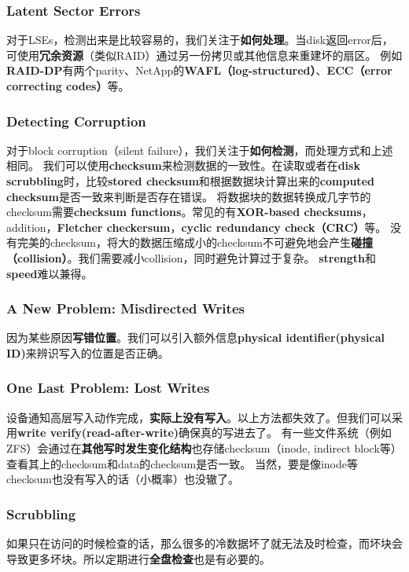 \documentclass{article}
\begin{document}
\subsubsection{Latent Sector Errors}
对于LSEs，检测出来是比较容易的，我们关注于\textbf{如何处理}。当disk返回error后，可使用\textbf{冗余资源}（类似RAID）通过另一份拷贝或其他信息来重建坏的扇区。
例如\textbf{RAID-DP}有两个parity、NetApp的\textbf{WAFL（log-structured）}、\textbf{ECC（error correcting codes）}等。
\subsubsection{Detecting Corruption}
对于block corruption（silent failure），我们关注于\textbf{如何检测}，而处理方式和上述相同。
我们可以使用\textbf{checksum}来检测数据的一致性。在读取或者在\textbf{disk scrubbling}时，比较\textbf{stored checksum}和根据数据块计算出来的\textbf{computed checksum}是否一致来判断是否存在错误。
将数据块的数据转换成几字节的checksum需要\textbf{checksum functions}。常见的有\textbf{XOR-based checksums}，addition，\textbf{Fletcher checkersum}，\textbf{cyclic redundancy check（CRC）}等。
没有完美的checksum，将大的数据压缩成小的checksum不可避免地会产生\textbf{碰撞（collision）}。我们需要减小collision，同时避免计算过于复杂。
\textbf{strength}和\textbf{speed}难以兼得。
\subsubsection{A New Problem: Misdirected Writes}
因为某些原因\textbf{写错位置}。我们可以引入额外信息\textbf{physical identifier(physical ID)}来辨识写入的位置是否正确。
\subsubsection{One Last Problem: Lost Writes}
设备通知高层写入动作完成，\textbf{实际上没有写入}。以上方法都失效了。但我们可以采用\textbf{write verify(read-after-write)}确保真的写进去了。
有一些文件系统（例如ZFS）会通过在\textbf{其他写时发生变化结构}也存储checksum（inode, indirect block等）查看其上的checksum和data的checksum是否一致。
当然，要是像inode等checksum也没有写入的话（小概率）也没辙了。
\subsubsection{Scrubbling}
如果只在访问的时候检查的话，那么很多的冷数据坏了就无法及时检查，而坏块会导致更多坏块。所以定期进行\textbf{全盘检查}也是有必要的。
\end{document}
